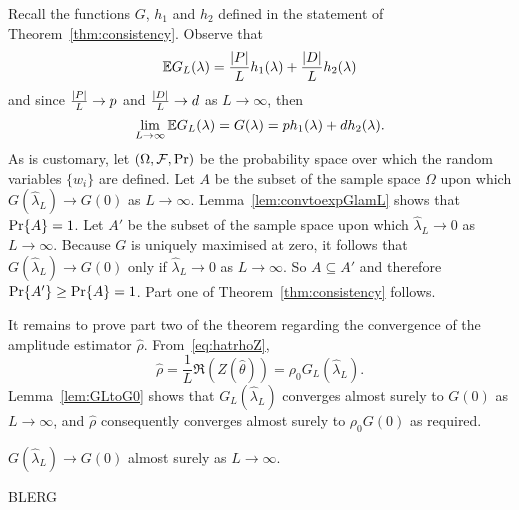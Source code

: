 \documentclass[journal]{IEEEtran}
\begin{document}
Recall the functions $G$, $h_1$ and $h_2$ defined in the statement of Theorem~\ref{thm:consistency}.  Observe that
\[
{\mathbb E} G_L(\lambda) = \frac{{\left\vert P \right\vert}}{L} h_1(\lambda) + \frac{{\left\vert D \right\vert}}{L} h_2(\lambda)
\]
and since $\frac{{\left\vert P \right\vert}}{L} \rightarrow p$ and $\frac{{\left\vert D \right\vert}}{L} \rightarrow d$ as $L \rightarrow \infty$, then
\[
\lim_{L \rightarrow\infty} {\mathbb E} G_L(\lambda) = G(\lambda) = p h_1(\lambda)   +  d h_2(\lambda).
\]
As is customary, let $(\Omega, \mathcal F, {\operatorname{Pr}})$ be the probability space over which the random variables $\{w_i\}$ are defined.  Let $A$ be the subset of the sample space $\Omega$ upon which $G(\hat{\lambda}_L) \rightarrow G(0)$ as $L\rightarrow\infty$.  Lemma~\ref{lem:convtoexpGlamL} shows that ${\operatorname{Pr}}\{A\} = 1$.  Let $A'$ be the subset of the sample space upon which $\hat{\lambda}_L \rightarrow 0$ as $L\rightarrow \infty$.  Because $G$ is uniquely maximised at zero, it follows that $G(\widehat{\lambda}_L) \rightarrow G(0)$ only if $\widehat{\lambda}_L \rightarrow 0$ as $L \rightarrow\infty$. So $A \subseteq A'$ and therefore ${\operatorname{Pr}}\{A'\} \geq {\operatorname{Pr}}\{A\} = 1$.  Part one of Theorem~\ref{thm:consistency} follows.  

It remains to prove part two of the theorem regarding the convergence of the amplitude estimator $\hat{\rho}$.  From~\eqref{eq:hatrhoZ},
\begin{equation}\label{eq:rhoGLZ}
\hat{\rho} = \frac{1}{L}\Re(Z(\hat{\theta})) = \rho_0 G_L(\hat{\lambda}_L).
\end{equation}  
Lemma~\ref{lem:GLtoG0} shows that $G_L(\hat{\lambda}_L)$ converges almost surely to $G(0)$ as $L\rightarrow\infty$, and $\hat{\rho}$ consequently converges almost surely to $\rho_0 G(0)$ as required.

\begin{lemma}\label{lem:convtoexpGlamL} 
$G(\hat{\lambda}_L) \rightarrow G(0)$ almost surely as $L \rightarrow \infty$.
\end{lemma}
\begin{IEEEproof}
BLERG
\end{IEEEproof}
\end{document}
